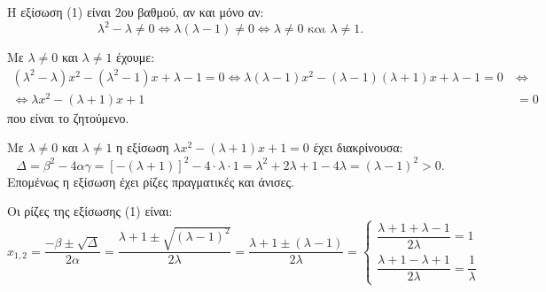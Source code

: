
\begin{alist}
\item Η εξίσωση (1) είναι $2$ου βαθμού, αν και μόνο αν:
\[\lambda^2 - \lambda \ne 0 \Leftrightarrow \lambda(\lambda - 1) \ne 0 \Leftrightarrow \lambda \ne 0 \text{ και } \lambda \ne 1.\]

\item Με $\lambda \ne 0$ και $\lambda \ne 1$ έχουμε:
\begin{align*}
(\lambda^2 - \lambda)x^2 - (\lambda^2 - 1)x + \lambda - 1 = 0 \Leftrightarrow \lambda(\lambda - 1)x^2 - (\lambda - 1)(\lambda + 1)x + \lambda - 1 = 0 \ &\Leftrightarrow \\
\Leftrightarrow \lambda x^2 - (\lambda + 1)x + 1 &= 0
\end{align*}
που είναι το ζητούμενο.

\item Με $\lambda \ne 0$ και $\lambda \ne 1$ η εξίσωση $\lambda x^2 - (\lambda + 1)x + 1 = 0$ έχει διακρίνουσα:
\[\Delta = \beta^2 - 4\alpha\gamma = [-(\lambda + 1)]^2 - 4 \cdot \lambda \cdot 1 = \lambda^2 + 2\lambda + 1 - 4\lambda = (\lambda - 1)^2 > 0.\]
Επομένως η εξίσωση έχει ρίζες πραγματικές και άνισες.

\item Οι ρίζες της εξίσωσης (1) είναι:
\[x_{1,2} = \dfrac{-\beta \pm \sqrt{\Delta}}{2\alpha} = \dfrac{\lambda + 1 \pm \sqrt{(\lambda - 1)^2}}{2\lambda} = \dfrac{\lambda + 1 \pm (\lambda - 1)}{2\lambda} = \begin{cases} \dfrac{\lambda + 1 + \lambda - 1}{2\lambda} = 1 \\ \dfrac{\lambda + 1 - \lambda + 1}{2\lambda} = \dfrac{1}{\lambda} \end{cases}\]
\end{alist}

